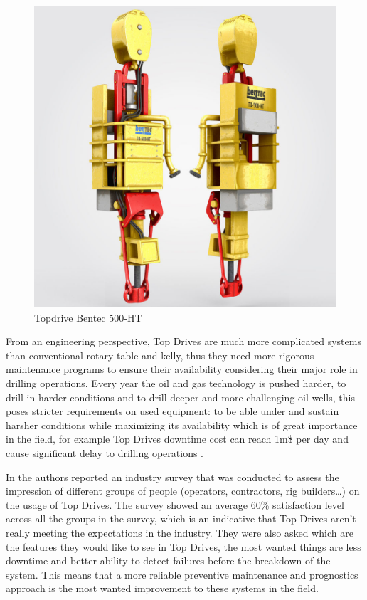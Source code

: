 \begin{figure}[h]
	\centering
	\includegraphics[width=0.9\linewidth]{figures/bentec_500_ht.jpg}
	\caption{Topdrive Bentec 500-HT}%
	\label{fig:figures/bentec_500_ht}
\end{figure}

From an engineering perspective, Top Drives are much more complicated systems than conventional rotary table and kelly, thus they need more rigorous maintenance programs to ensure their availability considering their major role in drilling operations. Every year the oil and gas technology is pushed harder, to drill in harder conditions and to drill deeper and more challenging oil wells, this poses stricter requirements on used equipment: to be able under and sustain harsher conditions while maximizing its availability which is of great importance in the field, for example  Top Drives downtime cost can reach 1m\$ per day and cause significant delay to drilling operations \cite{skfbrochure}. 

In \cite{Pournazari2016} the authors reported an industry survey that was conducted to assess the impression of different groups of people (operators, contractors, rig builders…) on the usage of Top Drives. The survey showed an average 60\% satisfaction level across all the groups in the survey, which is an indicative that Top Drives aren't really meeting the expectations in the industry. They were also asked which are the features they would like to see in Top Drives, the most wanted things are less downtime and better ability to detect failures before the breakdown of the system. This means that a more reliable preventive maintenance and prognostics approach is the most wanted improvement to these systems in the field.

